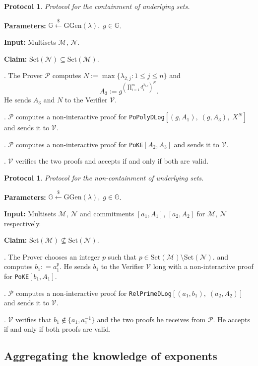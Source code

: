 \documentclass[11pt, lettersize, notitlepage, leqno, footskip=0.6cm]{article}
\newcommand{\pl}{\prod\limits}
\newcommand{\sett}{\mr{Set}}
\newcommand{\mc}{\mathcal}
\newcommand{\mb}{\mathbb}
\newcommand{\mr}{\mathrm}
\newcommand{\lam}{\lambda}
\newcommand{\lamb}{\lambda}
\newcommand{\sub}{\subseteq}
\newcommand{\nsub}{\nsubseteq}
\newcommand{\mP}{\mc{P}}
\newcommand{\V}{\mc{V}}
\newcommand{\vs}{\vspace{-0.15cm}}
\newcommand{\noin}{\noindent}
\newtheorem{Prot}[Thm]{Protocol}
\numberwithin{equation}{section}
\begin{document}
\begin{Prot} Protocol for the containment of underlying sets.\end{Prot} \vs

\noin \textbf{Parameters:} $\mb{G}\xleftarrow{\$} \mr{GGen}(\lamb), \; g\in \mb{G}$.

\noin \textbf{Input:} Multisets $\mc{M}$, $\mc{N}$.

\noin \textbf{Claim:} $\sett(\mc{N})\sub \sett(\mc{M})$.

\noin 1. The Prover $\mP$ computes $N:= \max\{\lam_{2,j}:1\leq j\leq n \}$ and \vs $$A_3:= g^{(\pl_{i=1}^m d_i^{\lam_{1,i}})^N}.$$ He sends $A_3$ and $N$ to the Verifier $\V$.

\noin 2. $\mP$ computes a non-interactive proof for \verb|PoPolyDLog|$[(g, A_1),\;(g, A_3),\;X^N]$ and sends it to $\V$.

\noin 3. $\mP$ computes a non-interactive proof for \verb|PoKE|$[A_2,A_3]$ and sends it to $\V$.

\noin 4. $\V$ verifies the two proofs and accepts if and only if both are valid.

\bigskip

\begin{Prot} Protocol for the non-containment of underlying sets.\end{Prot}\vs

\noin \textbf{Parameters:} $\mb{G}\xleftarrow{\$} \mr{GGen}(\lamb), \; g\in \mb{G}$.

\noin \textbf{Input:} Multisets $\mc{M}$, $\mc{N}$ and commitments $[a_1, A_1]$, $[a_2, A_2]$ for $\mc{M}$, $\mc{N}$ respectively.

\noin \textbf{Claim:} $\sett(\mc{M})\nsub \sett(\mc{N})$.

\noin 1. The Prover chooses an integer $p$ such that $p\in \sett(\mc{M})\setminus \sett(\mc{N}).$ and computes $b_1: = a_1^p$. He sends $b_1$ to the Verifier $\V$ long with a non-interactive proof for \verb|PoKE|$[b_1, A_1]$.

\noin 2. $\mP$ computes a non-interactive proof for \verb|RelPrimeDLog|$[(a_1, b_1),\; (a_2, A_2)]$ and sends it to $\V$.

\noin 3. $\V$ verifies that $b_1\notin \{ a_1, a_1^{-1}\}$ and the two proofs he receives from $\mP$. He accepts if and only if both proofs are valid.


\bigskip



\subsection{\fontsize{11}{11}\selectfont Aggregating the knowledge of exponents}
\end{document}
